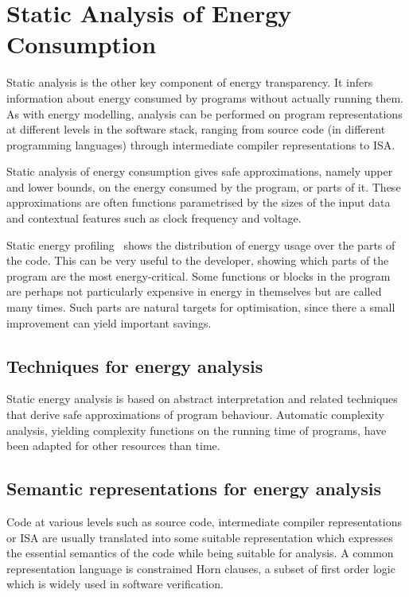 
\section{Static Analysis of Energy Consumption}\label{energy-analysis}

Static analysis is the other key component of energy transparency.
It infers information about energy consumed by programs without
actually running them. As with energy modelling, analysis can be performed on
program representations at different levels 
in the software stack, ranging from source code (in different programming
languages) through intermediate compiler representations to ISA.

Static analysis of energy consumption 
gives safe approximations, namely upper and lower bounds, on the energy
consumed by the program, or parts of it. These approximations are often
functions parametrised by the sizes of the input data and contextual
features such as clock frequency and voltage. 

Static energy profiling~\cite{staticprofiling-flops} shows the
distribution of energy usage over the parts of the code. This can be
very useful to the developer, showing which parts of the program are the
most energy-critical. Some functions or blocks in the program are
perhaps not particularly expensive in energy in themselves but are
called many times. Such parts are natural targets for optimisation,
since there a small improvement can yield important savings. 

\subsection{Techniques for energy analysis}

Static energy analysis is based on abstract interpretation and related techniques that
derive safe approximations of program behaviour. Automatic complexity analysis, 
yielding complexity functions on the running time of programs, have been adapted for
other resources than time. 

\subsection{Semantic representations for energy analysis}
Code at various levels such as  source code, intermediate compiler representations or ISA
are usually translated into some suitable representation which expresses
the essential semantics of the code while being suitable for analysis.  A common representation 
language is constrained Horn
clauses, a subset of first order logic which is widely used in software verification.


